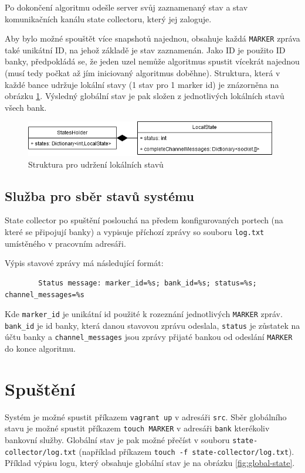 \documentclass[11pt,a4paper]{scrartcl}
\begin{document}
	Po dokončení algoritmu odešle server svůj zaznamenaný stav a stav komunikačních kanálu state collectoru, který jej zaloguje. 
	
	Aby bylo možné spouštět více snapshotů najednou, obsahuje každá \verb|MARKER| zpráva také unikátní ID, na jehož základě je stav zaznamenán. Jako ID je použito ID banky, předpokládá se, že jeden uzel nemůže algoritmus spustit vícekrát najednou (musí tedy počkat až jím iniciovaný algoritmus doběhne). Struktura, která v každé bance udržuje lokální stavy (1 stav pro 1 marker id) je znázorněna na obrázku \ref{fig:state-holder}. Výsledný globální stav je pak složen z jednotlivých lokálních stavů všech bank.
	
	\begin{figure}[H]
		\centering
		\includegraphics[width=11cm]{img/state-holder.png}
		\caption{Struktura pro udržení lokálních stavů}
		\label{fig:state-holder}
	\end{figure}
	
	\subsection{Služba pro sběr stavů systému}
	State collector po spuštění poslouchá na předem konfigurovaných portech (na které se připojují banky) a vypisuje příchozí zprávy so souboru \verb|log.txt| umístěného v pracovním adresáři.
	
	Výpis stavové zprávy má následující formát:
	
	\begin{verbatim}
		Status message: marker_id=%s; bank_id=%s; status=%s; channel_messages=%s
	\end{verbatim}
	
	Kde \verb|marker_id| je unikátní id použité k rozeznání jednotlivých \verb|MARKER| zpráv. \verb|bank_id| je id banky, která danou stavovou zprávu odeslala, \verb|status| je zůstatek na účtu banky a \verb|channel_messages| jsou zprávy přijaté bankou od odeslání \verb|MARKER| do konce algoritmu.
	
	\section{Spuštění}
	Systém je možné spustit příkazem \verb|vagrant up| v adresáři \verb|src|. Sběr globálního stavu je možné spustit příkazem \verb|touch MARKER| v adresáři \verb|bank| kterékoliv bankovní služby. Globální stav je pak možné přečíst v souboru \verb|state-collector/log.txt| (například příkazem \verb|touch -f state-collector/log.txt|). Příklad výpisu logu, který obsahuje globální stav je na obrázku \ref{fig:global-state}.
	
\end{document}
